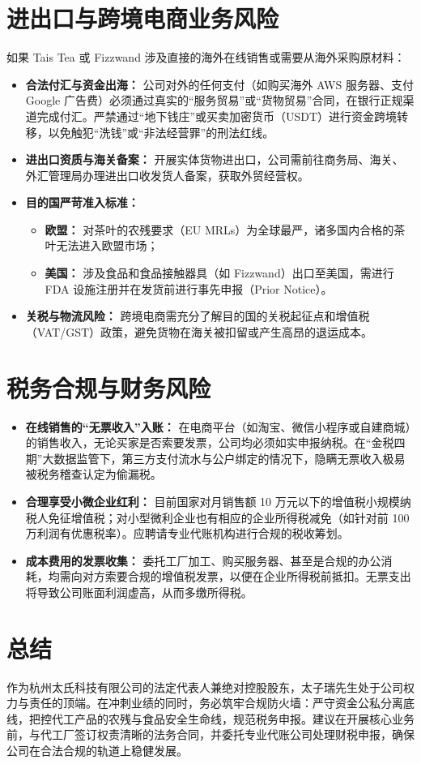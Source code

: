 \documentclass[a4paper, 12pt]{ctexart}
\begin{document}
\section{进出口与跨境电商业务风险}
如果 Tais Tea 或 Fizzwand 涉及直接的海外在线销售或需要从海外采购原材料：
\begin{itemize}
    \item \textbf{合法付汇与资金出海：} 公司对外的任何支付（如购买海外 AWS 服务器、支付 Google 广告费）必须通过真实的“服务贸易”或“货物贸易”合同，在银行正规渠道完成付汇。严禁通过“地下钱庄”或买卖加密货币（USDT）进行资金跨境转移，以免触犯“洗钱”或“非法经营罪”的刑法红线。
    \item \textbf{进出口资质与海关备案：} 开展实体货物进出口，公司需前往商务局、海关、外汇管理局办理进出口收发货人备案，获取外贸经营权。
    \item \textbf{目的国严苛准入标准：} 
        \begin{itemize}
            \item \textbf{欧盟：} 对茶叶的农残要求（EU MRLs）为全球最严，诸多国内合格的茶叶无法进入欧盟市场；
            \item \textbf{美国：} 涉及食品和食品接触器具（如 Fizzwand）出口至美国，需进行 FDA 设施注册并在发货前进行事先申报（Prior Notice）。
        \end{itemize}
    \item \textbf{关税与物流风险：} 跨境电商需充分了解目的国的关税起征点和增值税（VAT/GST）政策，避免货物在海关被扣留或产生高昂的退运成本。
\end{itemize}

\section{税务合规与财务风险}
\begin{itemize}
    \item \textbf{在线销售的“无票收入”入账：} 在电商平台（如淘宝、微信小程序或自建商城）的销售收入，无论买家是否索要发票，公司均必须如实申报纳税。在“金税四期”大数据监管下，第三方支付流水与公户绑定的情况下，隐瞒无票收入极易被税务稽查认定为偷漏税。
    \item \textbf{合理享受小微企业红利：} 目前国家对月销售额 10 万元以下的增值税小规模纳税人免征增值税；对小型微利企业也有相应的企业所得税减免（如针对前 100 万利润有优惠税率）。应聘请专业代账机构进行合规的税收筹划。
    \item \textbf{成本费用的发票收集：} 委托工厂加工、购买服务器、甚至是合规的办公消耗，均需向对方索要合规的增值税发票，以便在企业所得税前抵扣。无票支出将导致公司账面利润虚高，从而多缴所得税。
\end{itemize}

\section{总结}
作为杭州太氏科技有限公司的法定代表人兼绝对控股股东，太子瑞先生处于公司权力与责任的顶端。在冲刺业绩的同时，务必筑牢合规防火墙：严守资金公私分离底线，把控代工产品的农残与食品安全生命线，规范税务申报。建议在开展核心业务前，与代工厂签订权责清晰的法务合同，并委托专业代账公司处理财税申报，确保公司在合法合规的轨道上稳健发展。
\end{document}
